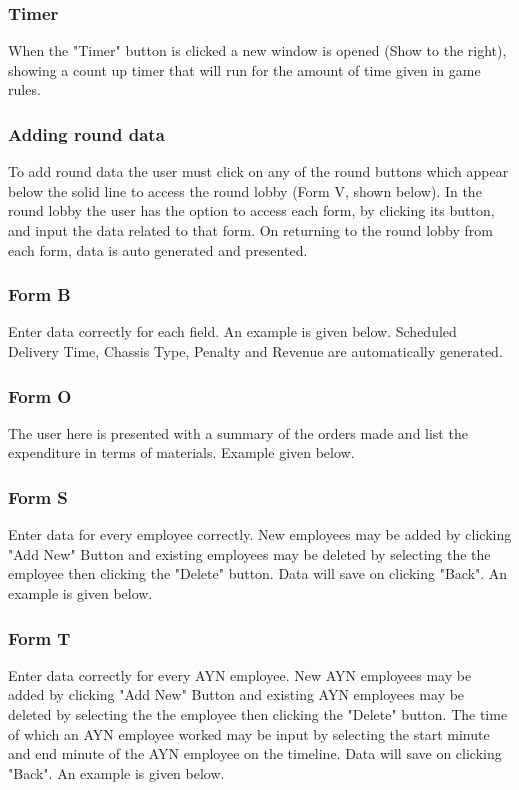 \documentclass{l3proj}
\begin{document}
\subsubsection{Timer}
When the "Timer" button is clicked a new window is opened (Show to the right), showing a count up timer that will run for the amount of time given in game rules.
\subsubsection{Adding round data}
To add round data the user must click on any of the round buttons which appear below the solid line to access the round lobby (Form V, shown below).
In the round lobby the user has the option to access each form, by clicking its button, and input the data related to that form. On returning to the round lobby from each form, data is auto generated and presented.
\subsubsection{Form B}
Enter data correctly for each field. An example is given below. Scheduled Delivery Time, Chassis Type, Penalty and Revenue are automatically generated.
\subsubsection{Form O}
The user here is presented with a summary of the orders made and list the expenditure in terms of materials. Example given below.
\subsubsection{Form S}
Enter data for every employee correctly. New employees may be added by clicking "Add New" Button and existing employees may be deleted by selecting the the employee then clicking the "Delete" button. Data will save on clicking "Back". An example is given below.
\subsubsection{Form T}
Enter data correctly for every AYN employee. New AYN employees may be added by clicking "Add New" Button and existing AYN employees may be deleted by selecting the the employee then clicking the "Delete" button. The time of which an AYN employee worked may be input by selecting the start minute and end minute of the AYN employee on the timeline. Data will save on clicking "Back". An example is given below.



\end{document}
